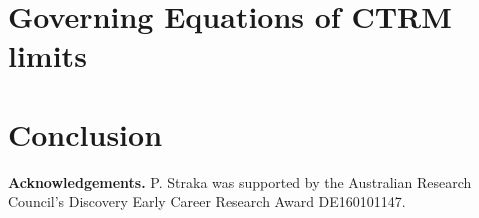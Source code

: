 \documentclass[12pt, a4paper]{article}
\newcommand{\1}{\mathbf 1}
\begin{document}
\section{Governing Equations of CTRM limits}




\section{Conclusion}


{\bf Acknowledgements.} P. Straka was supported by the Australian Research Council’s Discovery Early Career Research Award DE160101147.




\end{document}
